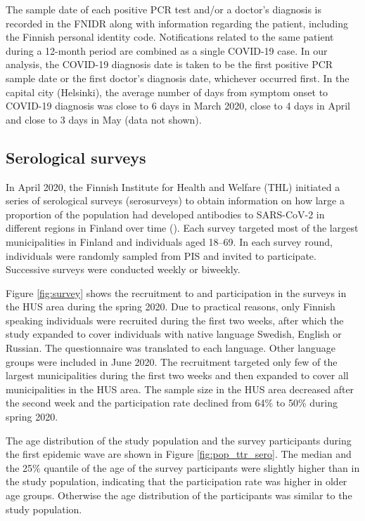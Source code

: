 \documentclass[aoas]{imsart}
\begin{document}
The sample date of each positive PCR test and/or a doctor's diagnosis is recorded in the FNIDR along with information regarding the patient, including the Finnish personal identity code. Notifications related to the same patient during a 12-month period are combined as a single COVID-19 case. In our analysis, the COVID-19 diagnosis date is taken to be the first positive PCR sample date or the first doctor's diagnosis date, whichever occurred first. In the capital city (Helsinki), the average number of days from symptom onset to COVID-19 diagnosis was close to 6 days in March 2020, close to 4 days in April and close to 3 days in May (data not shown). 


\subsection{Serological surveys}

In April 2020, the Finnish Institute for Health and Welfare (THL) initiated a series of serological surveys (serosurveys) to obtain information on how large a proportion of the population had developed antibodies to SARS-CoV-2 in different regions in Finland over time (\cite{serostudy}). Each survey targeted most of the largest municipalities in Finland and individuals aged 18–69. In each survey round, individuals were randomly sampled from PIS and invited to participate. Successive surveys were conducted weekly or biweekly.  

Figure \ref{fig:survey} shows the recruitment to and participation in the surveys in the HUS area during the spring 2020. Due to practical reasons, only Finnish speaking individuals were recruited during the first two weeks, after which the study expanded to cover individuals with native language Swedish, English or Russian. The questionnaire was translated to each language. Other language groups were included in June 2020. The recruitment targeted only few of the largest municipalities during the first two weeks and then expanded to cover all municipalities in the HUS area. The sample size in the HUS area decreased after the second week and the participation rate declined from 64\% to 50\% during spring 2020. 

The age distribution of the study population and the survey participants during the first epidemic wave are shown in Figure \ref{fig:pop_ttr_sero}. The median and the 25\% quantile of the age of the survey participants were slightly higher than in the study population, indicating that the participation rate was higher in older age groups. Otherwise the age distribution of the participants was similar to the study population. 
\end{document}
